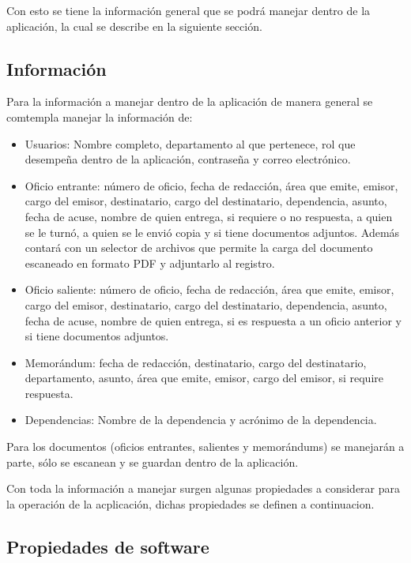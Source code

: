 Con esto se tiene la información general que se podrá manejar dentro de la aplicación, la cual se describe en la siguiente sección.

\subsection{Información}

Para la información a manejar dentro de la aplicación de manera general se comtempla manejar la información de:
\begin{itemize}
	\item Usuarios: Nombre completo, departamento al que pertenece, rol que desempeña dentro de la aplicación, contraseña y correo electrónico.
	\item Oficio entrante: número de oficio, fecha de redacción, área que emite, emisor, cargo del emisor, destinatario, cargo del destinatario, dependencia, asunto, fecha de acuse, nombre de quien entrega, si requiere o no respuesta, a quien se le turnó, a quien se le envió copia y si tiene documentos adjuntos. Además contará con un selector de archivos que permite la carga del documento escaneado en formato PDF y adjuntarlo al registro.
	\item Oficio saliente: número de oficio, fecha de redacción, área que emite, emisor, cargo del emisor, destinatario, cargo del destinatario, dependencia, asunto, fecha de acuse, nombre de quien entrega, si es respuesta a un oficio anterior y si tiene documentos adjuntos.
	\item Memorándum: fecha de redacción, destinatario, cargo del destinatario, departamento, asunto, área que emite, emisor, cargo del emisor, si require respuesta.  
	\item Dependencias: Nombre de la dependencia y acrónimo de la dependencia.
\end{itemize}

Para los documentos (oficios entrantes, salientes y memorándums) se manejarán a parte, sólo se escanean y se guardan dentro de la aplicación. 

Con toda la información a manejar surgen algunas propiedades a considerar para la operación de la acplicación, dichas propiedades se definen a continuacion.\\

\subsection{Propiedades de software}

